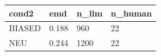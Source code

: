 \begin{table}
\centering
\begin{tabular}{llll}
\toprule
cond2 & emd & n_llm & n_human \\
\midrule
BIASED & 0.188 &  960 & 22 \\
NEU & 0.244 & 1200 & 22 \\
\bottomrule
\end{tabular}
\end{table}

